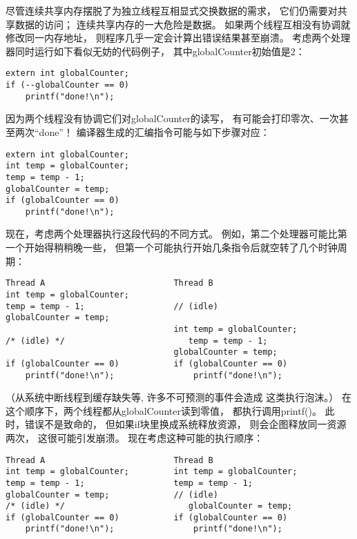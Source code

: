 尽管连续共享内存摆脱了为独立线程互相显式交换数据的需求，
它们仍需要对共享数据的访问；
连续共享内存的一大危险是数据。
如果两个线程互相没有协调就修改同一内存地址，
则程序几乎一定会计算出错误结果甚至崩溃。
考虑两个处理器同时运行如下看似无妨的代码例子，
其中{\ttfamily globalCounter}初始值是2：
\begin{lstlisting}
extern int globalCounter;
if (--globalCounter == 0)
    printf("done!\n");
\end{lstlisting}

因为两个线程没有协调它们对{\ttfamily globalCounter}的读写，
有可能会打印零次、一次甚至两次“done”！
编译器生成的汇编指令可能与如下步骤对应：
\begin{lstlisting}
extern int globalCounter;
int temp = globalCounter;
temp = temp - 1;
globalCounter = temp;
if (globalCounter == 0)
    printf("done!\n");
\end{lstlisting}

现在，考虑两个处理器执行这段代码的不同方式。
例如，第二个处理器可能比第一个开始得稍稍晚一些，
但第一个可能执行开始几条指令后就空转了几个时钟周期：
\begin{lstlisting}
Thread A                          Thread B
int temp = globalCounter;   
temp = temp - 1;                  // (idle)
globalCounter = temp;             
                                  int temp = globalCounter;
/* (idle) */                         temp = temp - 1;
                                  globalCounter = temp;
if (globalCounter == 0)           if (globalCounter == 0)
    printf("done!\n");                printf("done!\n");
\end{lstlisting}
（从系统中断线程到缓存缺失等,
许多不可预测的事件会造成
这类执行泡沫。）
在这个顺序下，两个线程都从{\ttfamily globalCounter}读到零值，
都执行调用{\ttfamily printf()}。
此时，错误不是致命的，
但如果{\ttfamily if}块里换成系统释放资源，
则会企图释放同一资源两次，
这很可能引发崩溃。
现在考虑这种可能的执行顺序：
\begin{lstlisting}
Thread A                          Thread B
int temp = globalCounter;         int temp = globalCounter;
temp = temp - 1;                  temp = temp - 1;
globalCounter = temp;             // (idle)
/* (idle) */                         globalCounter = temp;
if (globalCounter == 0)           if (globalCounter == 0)
    printf("done!\n");                printf("done!\n");
\end{lstlisting}

